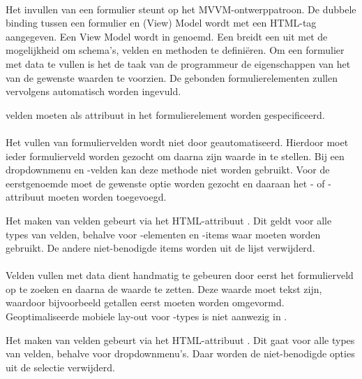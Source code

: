 \paragraph{\kendo}
Het invullen van een formulier steunt op het MVVM-ontwerppatroon.
De dubbele binding tussen een formulier en (View) Model wordt met een HTML-tag aangegeven.
Een View Model wordt in \kendo{}  genoemd.
Een  breidt een  uit met de mogelijkheid om schema's,  velden en methoden te definiëren.  
Om een formulier met data te vullen is het de taak van de programmeur de eigenschappen van het  van de gewenste waarden te voorzien.
De gebonden formulierelementen zullen vervolgens automatisch worden ingevuld.

 velden moeten als attribuut in het formulierelement worden gespecificeerd.

\paragraph{\jqm}
Het vullen van formuliervelden wordt niet door \jqm{} geautomatiseerd.
Hierdoor moet ieder formulierveld worden gezocht om daarna zijn waarde in te stellen.
Bij een dropdownmenu en -velden kan deze methode niet worden gebruikt.
Voor de eerstgenoemde moet de gewenste optie worden gezocht en daaraan het - of -attribuut moeten worden toegevoegd.

Het  maken van velden gebeurt via het HTML-attribuut .
Dit geldt voor alle types van velden, behalve voor -elementen en -items waar  moeten worden gebruikt.
De andere niet-benodigde items worden uit de lijst verwijderd.

\paragraph{\lungo}
Velden vullen met data dient handmatig te gebeuren door eerst het formulierveld op te zoeken en daarna de waarde te zetten.
Deze waarde moet tekst zijn, waardoor bijvoorbeeld getallen eerst moeten worden omgevormd.
Geoptimaliseerde mobiele lay-out voor -types is niet aanwezig in \lungo.

Het  maken van velden gebeurt via het HTML-attribuut .
Dit gaat voor alle types van velden, behalve voor dropdownmenu's.
Daar worden de niet-benodigde opties uit de selectie verwijderd.

